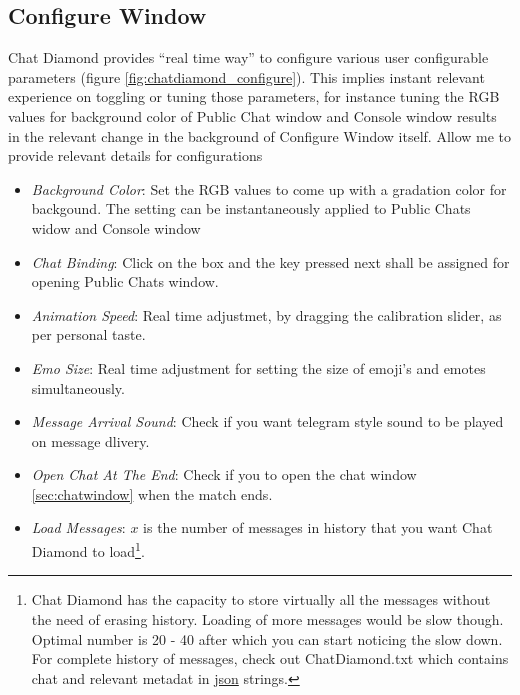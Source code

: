 \documentclass{article}
\theoremstyle{definition}
\newcommand{\FileColor}[1]{{\color{Purple} #1}}
\begin{document}
\subsection{Configure Window}
Chat Diamond provides ``real time way'' to configure various user configurable parameters (figure \ref{fig:chatdiamond_configure}).  This implies instant relevant experience on toggling or tuning those parameters, for instance 
tuning the RGB values  for background color of Public Chat window and Console window results in the relevant change in the background of Configure Window itself.   Allow me to provide 
relevant details for configurations
\begin{itemize}
\item \emph{Background Color}: Set the RGB values to come up with a gradation color for backgound.  The setting can be instantaneously applied to Public Chats widow and Console window
\item \emph{Chat Binding}: Click on the box and the key pressed next shall be assigned for opening Public Chats window.
\item \emph{Animation Speed}: Real time adjustmet, by dragging the calibration slider, as per personal taste.
\item \emph{Emo Size}: Real time adjustment for setting the size of emoji's and emotes simultaneously.
\item \emph{Message Arrival Sound}: Check if you want telegram style sound to be played on message dlivery.
\item \emph{Open Chat At The End}: Check if you to open the chat window \ref{sec:chatwindow} when the match ends.
\item \emph{Load Messages}: $x$ is the number of messages in history that you want Chat Diamond to load\footnote{Chat Diamond has the capacity to store virtually all the messages without the need of erasing history.  Loading of more messages would be slow though.  Optimal number is 20 - 40 after which you can start noticing the slow down.  For complete history of messages, check out \FileColor{ChatDiamond.txt} which contains chat and relevant metadat in \href{https://en.wikipedia.org/wiki/JSON}{json} strings.}.
\end{itemize}
\end{document}
